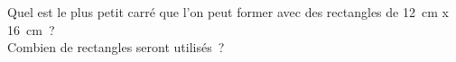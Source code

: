 %
%
Quel est le plus petit carré que l'on peut former avec des rectangles de \SI{12}{cm} x \SI{16}{cm}~? \\ Combien de rectangles seront utilisés~?
